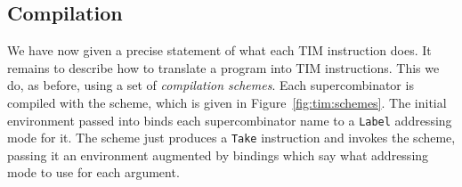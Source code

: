 \subsection{Compilation}

We have now given a precise statement of what each TIM instruction does.
It remains to describe how to translate a program into TIM instructions.
This we do, as before, using a set of {\em compilation schemes}.
Each supercombinator is compiled with the \tSC{} scheme, which is given
in Figure~\ref{fig:tim:schemes}.
The initial environment passed into \tSC{} binds each supercombinator name
to a \mbox{\tt Label} addressing mode for it.
The \tSC{} scheme just produces a
\mbox{\tt Take} instruction and invokes the \tR{} scheme, passing it an environment
augmented by bindings which say what addressing mode to use for each argument.
